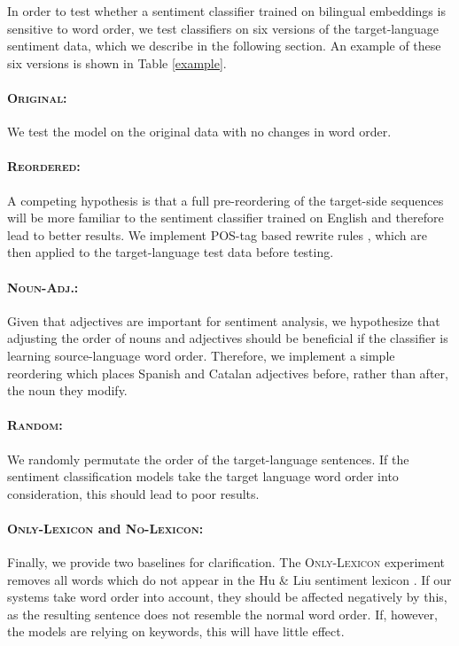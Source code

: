 \documentclass[11pt,a4paper]{article}
\newcommand{\original}{\textsc{Original}\xspace}
\newcommand{\mtreordered}{\textsc{Reordered}\xspace}
\newcommand{\nadj}{\textsc{Noun-Adj.}\xspace}
\newcommand{\random}{\textsc{Random}\xspace}
\newcommand{\onlylex}{\textsc{Only-Lexicon}\xspace}
\newcommand{\nolex}{\textsc{No-Lexicon}\xspace}
\begin{document}
In order to test whether a sentiment classifier trained on bilingual embeddings is sensitive to word order, we test classifiers on six versions of the target-language sentiment data, which we describe in the following section. An example of these six versions is shown in Table \ref{example}.

\paragraph{\original: } We test the model on the original data with no changes in word order.

\paragraph{\mtreordered: }A competing hypothesis is that a full pre-reordering of the target-side sequences will be more familiar to the sentiment classifier trained on English and therefore lead to better results. We implement POS-tag based rewrite rules \cite{Crego2006,Crego2006b}, which are then applied to the target-language test data before testing.

\paragraph{\nadj: }Given that adjectives are important for sentiment analysis, we hypothesize that adjusting the order of nouns and adjectives should be beneficial if the classifier is learning source-language word order. Therefore, we implement a simple reordering which places Spanish and Catalan adjectives before, rather than after, the noun they modify.

\paragraph{\random: }We randomly permutate the order of the target-language sentences. If the sentiment classification models take the target language word order into consideration, this should lead to poor results.

\paragraph{\onlylex and \nolex: }Finally, we provide two baselines for clarification. The \onlylex experiment removes all words which do
not appear in the Hu \& Liu sentiment lexicon \cite{HuandLiu2004}. If our systems
take word order into account, they should be affected negatively by this, as the
resulting sentence does not resemble the normal word order. If, however, the models
are relying on keywords, this will have little effect.
\end{document}
